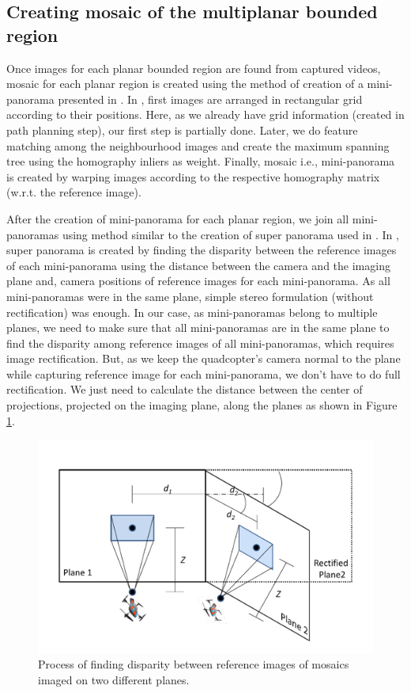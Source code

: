 \subsection{Creating mosaic of the multiplanar bounded region}
Once images for each planar bounded region are found from captured
videos, mosaic for each planar region is created using the method of creation of
a mini-panorama presented in \cite{Prasad16}. In \cite{Prasad16}, first images
are arranged in rectangular grid according to their positions. Here, as we already have grid
information (created in path planning step), our first step is partially done.
Later, we do feature matching among the neighbourhood images and create the
maximum spanning tree using  the homography inliers as weight. Finally, mosaic
i.e., mini-panorama is created by warping images according to the respective
homography matrix (w.r.t. the  reference image).

After the creation of mini-panorama for each planar region, we join all
mini-panoramas using method similar to the creation of super panorama used in
\cite{Prasad16}. In \cite{Prasad16}, super panorama is created by finding the
disparity between the reference images of each mini-panorama using the distance
between the camera and the imaging plane and, camera positions of reference
images for each mini-panorama. As all mini-panoramas were in the same plane,
simple stereo formulation (without rectification) was enough. In our case, as
mini-panoramas belong to multiple planes, we need to make sure that all
mini-panoramas are in the same plane to find the disparity among reference images of
 all mini-panoramas, which requires image rectification. But, as we keep the
 quadcopter's camera normal to the plane while capturing reference image for each
 mini-panorama, we don't have to do full rectification.
 We just need to calculate the distance between the center of projections, projected on the imaging plane, 
 along the planes as shown in Figure \ref{fig:multiplanarMosaic}.

\begin{figure}[ht!]
\centering
\includegraphics[width=\linewidth]{figures/multiplanar/MultiplanarMosaic}
\caption[Super panorama for multiplanar scene]{Process of finding disparity
between reference images of mosaics imaged on two different planes.}
\label{fig:multiplanarMosaic}
\end{figure}

